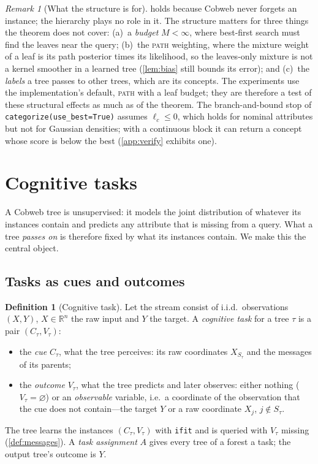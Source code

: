 \documentclass[11pt]{article}
\theoremstyle{definition}
\newtheorem{definition}[theorem]{Definition}
\theoremstyle{remark}
\newtheorem{remark}[theorem]{Remark}
\newcommand{\R}{\mathbb{R}}
\begin{document}
\begin{remark}[What the structure is for]\label{rem:structure}
 holds because Cobweb never forgets an instance; the hierarchy
plays no role in it.  The structure matters for three things the theorem does not
cover: (a)~a \emph{budget} $M<\infty$, where best-first search must find the leaves
near the query; (b)~the \textsc{path} weighting, where the mixture weight of a leaf is
its path posterior times its likelihood, so the leaves-only mixture is not a kernel
smoother in a learned tree (\cref{lem:bias} still bounds its error); and (c)~the
\emph{labels} a tree passes to other trees, which are its concepts.  The experiments use
the implementation's default, \textsc{path} with a leaf budget; they are therefore a
test of these structural effects as much as of the theorem.  The branch-and-bound stop
of \texttt{categorize(use\_best=True)} assumes $\ell_c\le0$, which holds for nominal
attributes but not for Gaussian densities; with a continuous block it can return a
concept whose score is below the best (\cref{app:verify} exhibits one).
\end{remark}

\section{Cognitive tasks}\label{sec:tasks}

A Cobweb tree is unsupervised: it models the joint distribution of whatever its
instances contain and predicts any attribute that is missing from a query.  What a tree
\emph{passes on} is therefore fixed by what its instances contain.  We make this the
central object.

\subsection{Tasks as cues and outcomes}

\begin{definition}[Cognitive task]\label{def:task}
Let the stream consist of i.i.d.\ observations $(X,Y)$, $X\in\R^n$ the raw input and
$Y$ the target.  A \emph{cognitive task} for a tree $\tau$ is a pair $(C_\tau,V_\tau)$:
\begin{itemize}[leftmargin=*]
\item the \emph{cue} $C_\tau$, what the tree perceives: its raw coordinates
  $X_{S_\tau}$ and the messages of its parents;
\item the \emph{outcome} $V_\tau$, what the tree predicts and later observes: either
  nothing ($V_\tau=\varnothing$) or an \emph{observable} variable, i.e.\ a coordinate of
  the observation that the cue does not contain---the target $Y$ or a raw coordinate
  $X_j$, $j\notin S_\tau$.
\end{itemize}
The tree learns the instances $(C_\tau,V_\tau)$ with \texttt{ifit} and is queried with
$V_\tau$ missing (\cref{def:messages}).  A \emph{task assignment} $A$ gives every tree
of a forest a task; the output tree's outcome is $Y$.
\end{definition}
\end{document}
